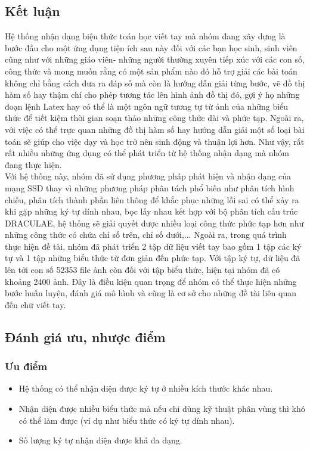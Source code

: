 \documentclass[a4paper,12pt]{article}
\begin{document}
	\subsection{Kết luận}
	Hệ thống nhận dạng biệu thức toán học viết tay mà nhóm đang xây dựng là bước đầu cho một ứng dụng tiện ích sau này đối với các bạn học sinh, sinh viên cũng như với những giáo viên- những người thường xuyên tiếp xúc với các con số, công thức và mong muốn rằng có một sản phẩm nào đó hỗ trợ giải các bài toán không chỉ bằng cách đưa ra đáp số mà còn là hướng dẫn giải từng bước, vẽ đồ thị hàm số hay thậm chí cho phép tương tác lên hình ảnh đồ thị đó, gợi ý họ những đoạn lệnh Latex hay có thể là một ngôn ngữ tương tự từ ảnh của những biểu thức để tiết kiệm thời gian soạn thảo những công thức dài và phức tạp. Ngoài ra, với việc có thể trực quan những đồ thị hàm số hay hướng dẫn giải một số loại bài toán sẽ giúp cho việc dạy và học trở nên sinh động và thuận lợi hơn. Như vậy, rất rất nhiều những ứng dụng có thể phát triển từ hệ thống nhận dạng mà nhóm đang thực hiện. \\
	Với hệ thống này, nhóm đã sử dụng phương pháp phát hiện và nhận dạng của mạng SSD thay vì những phương pháp phân tách phổ biến như phân tích hình chiếu, phân tích thành phần liên thông để khắc phục những lỗi sai có thể xảy ra khi gặp những ký tự dính nhau, bọc lấy nhau kết hợp với bộ phân tích cấu trúc DRACULAE, hệ thống sẽ giải quyết được nhiều loại công thức phức tạp hơn như những công thức có chứa chỉ số trên, chỉ số dưới,... 
	Ngoài ra, trong quá trình thực hiện đề tài, nhóm đã phát triển 2 tập dữ liệu viết tay bao gồm 1 tập các ký tự và 1 tập những biểu thức từ đơn giản đến phức tạp. Với tập ký tự, dữ liệu đã lên tới con số 52353 file ảnh còn đối với tập biểu thức, hiện tại nhóm đã có khoảng 2400 ảnh. Đây là điều kiện quan trọng để nhóm có thể thực hiện những bước huấn luyện, đánh giá mô hình và cũng là cơ sở cho những đề tài liên quan đến chữ viết tay. 
	\subsection{Đánh giá ưu, nhược điểm}
	
	\subsubsection{Ưu điểm}
	
	\begin{itemize}
		\item Hệ thống có thể nhận diện được ký tự ở nhiều kích thước khác nhau.
		\item Nhận diện được nhiều biểu thức mà nếu chỉ dùng kỹ thuật phân vùng thì khó có thể làm được (ví dụ như biểu thức có ký tự dính nhau).
		\item Số lượng ký tự nhận diện được khá đa dạng.
	\end{itemize}
	
\end{document}
